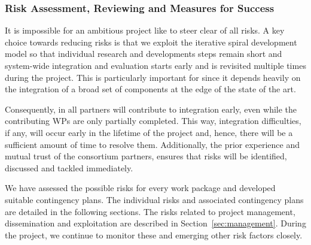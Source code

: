 
\subsubsection{Risk Assessment, Reviewing and Measures for Success}
It is impossible for an ambitious project like \Project{} to steer clear of all risks. A key choice towards reducing risks is that we exploit the iterative spiral development model so that individual research and developments steps remain short and system-wide integration and evaluation starts early and is revisited multiple times during the project. This is particularly important for \Project{} since it depends heavily on the integration of a broad set of components at the edge of the state of the art. 

Consequently, in \Project{} all partners will contribute to integration early, even while the contributing WPs are only partially completed. This way, integration
difficulties, if any, will occur early in the lifetime of the project and, hence, there will be a sufficient amount of time to resolve them. Additionally, the prior experience and mutual trust of the consortium partners, ensures that risks will be identified, discussed and tackled immediately.

We have assessed the possible risks for every work package and developed suitable contingency plans. The individual risks and associated contingency plans are detailed in the following sections. The risks related to project management, dissemination and exploitation are described in Section~\ref{sec:management}. During the project, we continue to monitor these and emerging other risk factors closely.

